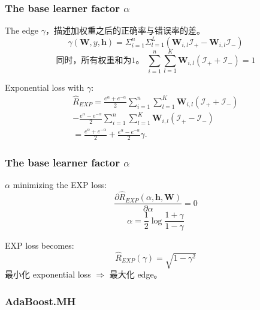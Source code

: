 \documentclass{beamer}
\begin{document}
\begin{frame}
\frametitle{The base learner factor $\alpha$}
The edge $\gamma$，描述加权重之后的正确率与错误率的差。 \\
$$ \gamma(\mathbf{W}, y, \mathbf{h}) = \Sigma_{i=1}^{n} \Sigma_{l=1}^{L} (\mathbf{W}_{i,l} \mathcal{I}_+ - \mathbf{W}_{i,l}\mathcal{I}_-)$$
$$\text{同时，所有权重和为1。 } \sum_{i=1}^{n} \sum_{l=1}^{K}\mathbf{W}_{i,l}(\mathcal{I}_+ + \mathcal{I}_-) = 1$$
\begin{block}{Exponential loss with $\gamma$:}
$$ \begin{array}{c}
\hat{R}_{EXP} = \frac{e^\alpha + e^{-\alpha}}{2}\sum_{i=1}^{n} \sum_{l=1}^{K}\mathbf{W}_{i,l}(\mathcal{I}_+ + \mathcal{I}_-) \\
 - \frac{e^\alpha - e^{-\alpha}}{2}\sum_{i=1}^{n}\sum_{l=1}^{K}\mathbf{W}_{i,l}(\mathcal{I}_+ - \mathcal{I}_-) \\
 = \frac{e^\alpha + e^{-\alpha}}{2} + \frac{e^\alpha - e^{-\alpha}}{2}\gamma.
\end{array} $$
\end{block}
\end{frame}


\begin{frame}
\frametitle{The base learner factor $\alpha$}
\begin{block}{$\alpha$ minimizing the EXP loss:}
$$\frac{\partial \hat{R}_{EXP}(\alpha, \mathbf{h}, \mathbf{W})}{\partial \alpha} = 0$$
$$\alpha = \frac{1}{2} \log \frac{1+\gamma}{1-\gamma}$$
\end{block}

\pause

\begin{block}{EXP loss becomes:}
$$\hat{R}_{EXP}(\gamma) = \sqrt{1 - \gamma^2}$$
最小化 exponential loss $\Rightarrow$ 最大化 edge。
\end{block}

\end{frame}

\begin{frame}
\frametitle{AdaBoost.MH}
\begin{algorithm}[H]
\end{algorithm}
\end{frame}
\end{document}

